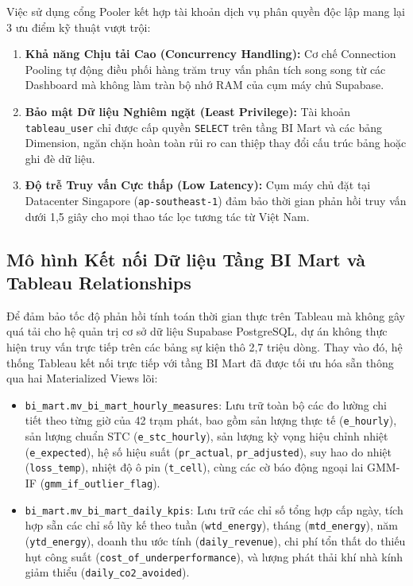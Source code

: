 \documentclass[12pt, a4paper]{report}
\begin{document}
Việc sử dụng cổng Pooler kết hợp tài khoản dịch vụ phân quyền độc lập mang lại 3 ưu điểm kỹ thuật vượt trội:
\begin{enumerate}[label=\arabic*., leftmargin=*]
    \item \textbf{Khả năng Chịu tải Cao (Concurrency Handling):} Cơ chế Connection Pooling tự động điều phối hàng trăm truy vấn phân tích song song từ các Dashboard mà không làm tràn bộ nhớ RAM của cụm máy chủ Supabase.
    \item \textbf{Bảo mật Dữ liệu Nghiêm ngặt (Least Privilege):} Tài khoản \texttt{tableau\_user} chỉ được cấp quyền \texttt{SELECT} trên tầng BI Mart và các bảng Dimension, ngăn chặn hoàn toàn rủi ro can thiệp thay đổi cấu trúc bảng hoặc ghi đè dữ liệu.
    \item \textbf{Độ trễ Truy vấn Cực thấp (Low Latency):} Cụm máy chủ đặt tại Datacenter Singapore (\texttt{ap-southeast-1}) đảm bảo thời gian phản hồi truy vấn dưới 1,5 giây cho mọi thao tác lọc tương tác từ Việt Nam.
\end{enumerate}

\subsection{Mô hình Kết nối Dữ liệu Tầng BI Mart và Tableau Relationships}
\label{subsec:bi_mart_model}

Để đảm bảo tốc độ phản hồi tính toán thời gian thực trên Tableau mà không gây quá tải cho hệ quản trị cơ sở dữ liệu Supabase PostgreSQL, dự án không thực hiện truy vấn trực tiếp trên các bảng sự kiện thô 2,7 triệu dòng. Thay vào đó, hệ thống Tableau kết nối trực tiếp với tầng BI Mart đã được tối ưu hóa sẵn thông qua hai Materialized Views lõi:
\begin{itemize}
    \item \texttt{bi\_mart.mv\_bi\_mart\_hourly\_measures}: Lưu trữ toàn bộ các đo lường chi tiết theo từng giờ của 42 trạm phát, bao gồm sản lượng thực tế (\texttt{e\_hourly}), sản lượng chuẩn STC (\texttt{e\_stc\_hourly}), sản lượng kỳ vọng hiệu chỉnh nhiệt (\texttt{e\_expected}), hệ số hiệu suất (\texttt{pr\_actual}, \texttt{pr\_adjusted}), suy hao do nhiệt (\texttt{loss\_temp}), nhiệt độ ô pin (\texttt{t\_cell}), cùng các cờ báo động ngoại lai GMM-IF (\texttt{gmm\_if\_outlier\_flag}).
    \item \texttt{bi\_mart.mv\_bi\_mart\_daily\_kpis}: Lưu trữ các chỉ số tổng hợp cấp ngày, tích hợp sẵn các chỉ số lũy kế theo tuần (\texttt{wtd\_energy}), tháng (\texttt{mtd\_energy}), năm (\texttt{ytd\_energy}), doanh thu ước tính (\texttt{daily\_revenue}), chi phí tổn thất do thiếu hụt công suất (\texttt{cost\_of\_underperformance}), và lượng phát thải khí nhà kính giảm thiểu (\texttt{daily\_co2\_avoided}).
\end{itemize}
\end{document}

